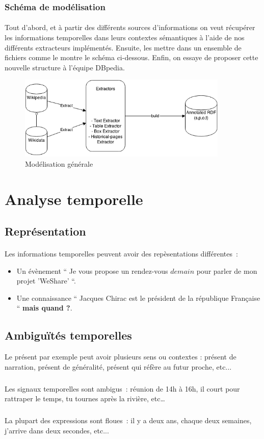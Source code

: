 \subsubsection*{Schéma de modélisation}
\paragraph{}
Tout d’abord, et à partir des différents sources d’informations on veut récupérer les informations temporelles dans leurs contextes sémantiques à l’aide de nos différents extracteurs implémentés. 
Ensuite, les mettre dans un ensemble de fichiers comme le montre le schéma ci-dessous.
Enfin, on essaye de proposer cette nouvelle structure à l’équipe DBpedia.
\begin{figure}[H]
        \centering
                \centering
                \includegraphics[width=10cm]{modelisation.png}
               \caption{Modélisation générale}

\end{figure}
\section*{Analyse temporelle}
\subsection*{Représentation}
\paragraph{}
Les informations temporelles peuvent avoir des repèsentations différentes~: 
\begin{itemize}
\item Un évènement `` Je vous propose un rendez-vous $demain$ pour parler de mon projet 'WeShare' ``. \item Une connaissance `` Jacques Chirac est le président de la république Française `` \textbf{ mais quand ?}.

\end{itemize}
 
\subsection*{Ambiguïtés temporelles}
Le présent par exemple peut avoir plusieurs sens ou contextes : présent de narration, présent de généralité, présent qui réfère au futur proche, etc...
\subparagraph{}
Les signaux temporelles sont ambigus~: réunion de 14h à 16h, il court pour rattraper le temps, tu tournes après la rivière, etc…
\subparagraph{}
La plupart des expressions sont floues~: il y a deux ans, chaque deux semaines, j’arrive dans deux secondes, etc...
